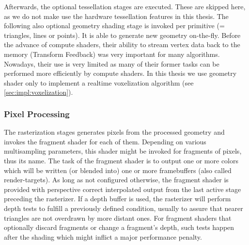 \documentclass[thesis.tex]{subfiles}
\begin{document}
Afterwards, the optional tessellation stages are executed.
These are skipped here, as we do not make use the hardware tessellation features in this thesis.
The following also optional geometry shading stage is invoked per primitive (= triangles, lines or points).
It is able to generate new geometry on-the-fly.
Before the advance of compute shaders, their ability to stream vertex data back to the memory (Transform Feedback) was very important for many algorithms.
Nowadays, their use is very limited as many of their former tasks can be performed more efficiently by compute shaders.
In this thesis we use geometry shader only to implement a realtime voxelization algorithm (see \autoref{sec:impl:voxelization}).


\subsubsection{Pixel Processing}
The rasterization stages generates pixels from the processed geometry and invokes the fragment shader for each of them.
Depending on various multisampling parameters, this shader might be invoked for fragments of pixels, thus its name.
The task of the fragment shader is to output one or more colors which will be written (or blended into) one or more framebuffers (also called render-targets).
As long as not configured otherwise, the fragment shader is provided with perspective correct interpolated output from the last active stage preceding the rasterizer.
If a depth buffer is used, the rasterizer will perform depth tests to fulfill a previously defined condition, usually to assure that nearer triangles are not overdrawn by more distant ones.
For fragment shaders that optionally discard fragments or change a fragment's depth, such tests happen after the shading which might inflict a major performance penalty.
\end{document}

